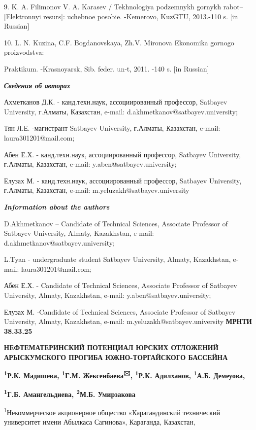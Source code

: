 9. K. A. Filimonov V. A. Karasev / Tekhnologiya podzemnykh gornykh
rabot-- {[}Elektronnyi resurs{]}: uchebnoe posobie. -Kemerovo, KuzGTU,
2013.-110 s. {[}in Russian{]}

10. L. N. Kuzina, C.F. Bogdanovskaya, Zh.V. Mironova Ekonomika gornogo
proizvodstva:

Praktikum. -Krasnoyarsk, Sib. feder. un-t, 2011. -140 s. {[}in
Russian{]}

\emph{{\bfseries Сведения об авторах}}

Ахметканов Д.К. - канд.техн.наук, ассоциированный профессор, Satbayev
University, г.Алматы, Казахстан, e-mail:
d.akhmetkanov@satbayev.university;

Тян Л.Е. -магистрант Satbayev University, г.Алматы, Казахстан, e-mail:
laura301201@mail.com;

Абен Е.Х. - канд.техн.наук, ассоциированный профессор, Satbayev
University, г.Алматы, Казахстан, e-mail: y.aben@satbayev.university;

Елузах М. - канд.техн.наук, ассоциированный профессор, Satbayev
University, г.Алматы, Казахстан, e-mail: m.yeluzakh@satbayev.university

\emph{{\bfseries Information about the authors}}

D.Akhmetkanov -- Candidate of Technical Sciences, Associate Professor of
Satbayev University, Almaty, Kazakhstan, e-mail:
d.akhmetkanov@satbayev.university;

L.Tyan - undergraduate student Satbayev University, Almaty, Kazakhstan,
e-mail: laura301201@mail.com;

Абен Е.Х. - Candidate of Technical Sciences, Associate Professor of
Satbayev University, Almaty, Kazakhstan, e-mail:
y.aben@satbayev.university;

Елузах М. -Candidate of Technical Sciences, Associate Professor of
Satbayev University, Almaty, Kazakhstan, e-mail:
m.yeluzakh@satbayev.university\newpage
{\bfseries МРНТИ 38.33.25}

{\bfseries НЕФТЕМАТЕРИНСКИЙ ПОТЕНЦИАЛ ЮРСКИХ ОТЛОЖЕНИЙ АРЫСКУМСКОГО ПРОГИБА
ЮЖНО-ТОРГАЙСКОГО БАССЕЙНА}

{\bfseries \textsuperscript{1}Р.К. Мадишева, \textsuperscript{1}Г.М.
Жексенбаева\textsuperscript{🖂}, \textsuperscript{1}Р.К. Адилханов,
\textsuperscript{1}А.Б. Демеуова,}

{\bfseries \textsuperscript{1}Г.Б. Амангельдиева, \textsuperscript{2}М.Б.
Умирзакова}

\textsuperscript{1}Некоммерческое акционерное общество «Карагандинский
технический университет имени Абылкаса Сагинова», Караганда, Казахстан,

